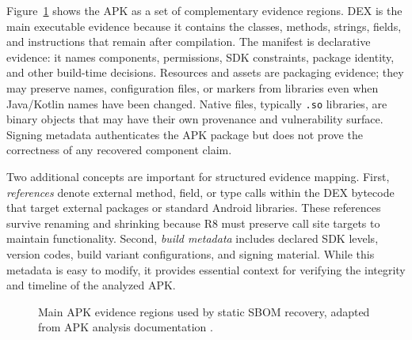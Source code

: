 Figure~\ref{fig:master-apk-anatomy} shows the APK as a set of complementary
evidence regions. DEX is the main executable evidence because it contains the
classes, methods, strings, fields, and instructions that remain after
compilation. The manifest is declarative evidence: it names components,
permissions, SDK constraints, package identity, and other build-time decisions.
Resources and assets are packaging evidence; they may preserve names,
configuration files, or markers from libraries even when Java/Kotlin names
have been changed. Native files, typically \texttt{.so} libraries, are binary
objects that may have their own provenance and vulnerability surface. Signing
metadata authenticates the APK package but does not prove the correctness of
any recovered component claim.

Two additional concepts are important for structured evidence mapping. First,
\emph{references} denote external method, field, or type calls within the DEX
bytecode that target external packages or standard Android libraries. These
references survive renaming and shrinking because R8 must preserve call site
targets to maintain functionality. Second, \emph{build metadata} includes
declared SDK levels, version codes, build variant configurations, and signing
material. While this metadata is easy to modify, it provides essential context
for verifying the integrity and timeline of the analyzed APK.

\begin{figure}[H]
\centering
{}
\caption{Main APK evidence regions used by static SBOM recovery, adapted from APK analysis documentation \cite{androidApkAnalyzer,androidManifestOverview}.}
\label{fig:master-apk-anatomy}
\end{figure}

